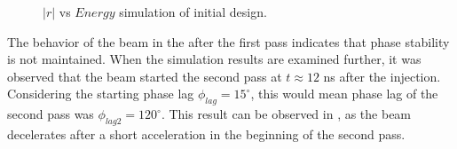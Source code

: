 \documentclass[a4paper,oneside,12pt]{report}
\numberwithin{equation}{chapter}
\begin{document}
\begin{figure}[H]
    \centering
    \vspace{20pt}
    \vspace{20pt}
    \caption{\centering $|r|$ vs $Energy$ simulation of initial design.} 
    \label{fig:initial_designs_PIC_phase_space_monitor}
\end{figure}
The behavior of the beam in the  after the first pass indicates that phase stability is not maintained. 
When the simulation results are examined further, it was observed that the beam started the second pass at $t \approx 12$ ns after the injection. 
Considering the starting phase lag $\phi_{lag}=15^\circ$, this would mean phase lag of the second pass was $\phi_{lag2}=120^\circ$.
This result can be observed in , as the beam decelerates after a short acceleration in the beginning of the second pass.
\end{document}
